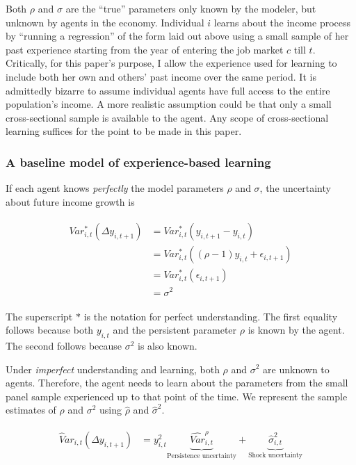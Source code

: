 \documentclass[12pt,notitlepage,onecolumn,aps,pra]{article}
\begin{document}
Both \(\rho\) and \(\sigma\) are the ``true'' parameters only known by
the modeler, but unknown by agents in the economy. Individual \(i\)
learns about the income process by ``running a regression'' of the form
laid out above using a small sample of her past experience starting from
the year of entering the job market \(c\) till \(t\). Critically, for
this paper's purpose, I allow the experience used for learning to
include both her own and others' past income over the same period. It is
admittedly bizarre to assume individual agents have full access to the
entire population's income. A more realistic assumption could be that
only a small cross-sectional sample is available to the agent. Any scope
of cross-sectional learning suffices for the point to be made in this
paper.

    \hypertarget{a-baseline-model-of-experience-based-learning}{%
\subsubsection{A baseline model of experience-based
learning}\label{a-baseline-model-of-experience-based-learning}}

If each agent knows \emph{perfectly} the model parameters \(\rho\) and
\(\sigma\), the uncertainty about future income growth is

\begin{eqnarray}
\begin{split}
Var^*_{i,t}(\Delta y_{i,t+1}) & =  Var^*_{i,t}(y_{i,t+1}- y_{i,t}) \\ 
& =  Var^*_{i,t}((\rho-1)y_{i,t} + \epsilon_{i,t+1}) \\
& = Var^*_{i,t}(\epsilon_{i,t+1}) \\
& = \sigma^2
\end{split}
\end{eqnarray}

The superscript \(*\) is the notation for perfect understanding. The
first equality follows because both \(y_{i,t}\) and the persistent
parameter \(\rho\) is known by the agent. The second follows because
\(\sigma^2\) is also known.

Under \emph{imperfect} understanding and learning, both \(\rho\) and
\(\sigma^2\) are unknown to agents. Therefore, the agent needs to learn
about the parameters from the small panel sample experienced up to that
point of the time. We represent the sample estimates of \(\rho\) and
\(\sigma^2\) using \(\widehat \rho\) and \(\hat{\sigma}^2\).

\begin{eqnarray}
\begin{split}
\widehat Var_{i,t}(\Delta y_{i,t+1}) & = y_{i,t}^2 \underbrace{\widehat{Var}^{\rho}_{i,t}}_{\text{Persistence uncertainty}} + \underbrace{\hat{\sigma}^2_{i,t}}_{\text{Shock uncertainty}}
\end{split}
\end{eqnarray}
\end{document}
